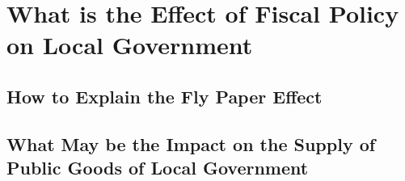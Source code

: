 
\chapter{What is the Effect of Fiscal Policy on Local Government}

\section{How to Explain the Fly Paper Effect}


\section{What May be the Impact on the Supply of Public Goods of Local Government}

